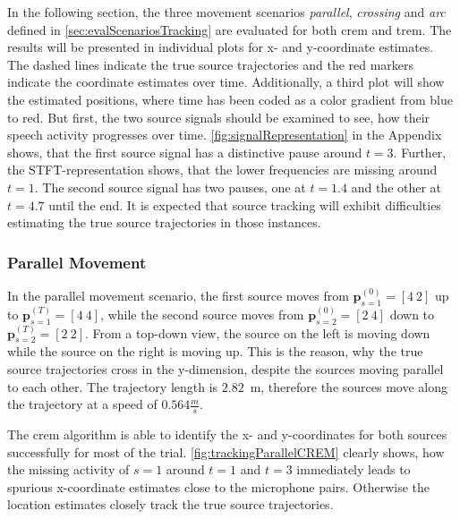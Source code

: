 In the following section, the three movement scenarios \emph{parallel}, \emph{crossing} and \emph{arc} defined in \autoref{sec:evalScenariosTracking} are evaluated for both \gls{crem} and \gls{trem}. The results will be presented in individual plots for x- and y-coordinate estimates. The dashed lines indicate the true source trajectories and the red markers indicate the coordinate estimates over time. Additionally, a third plot will show the estimated positions, where time has been coded as a color gradient from blue to red. But first, the two source signals should be examined to see, how their speech activity progresses over time. \autoref{fig:signalRepresentation} in the Appendix shows, that the first source signal has a distinctive pause around $t=3$. Further, the STFT-representation shows, that the lower frequencies are missing around $t=1$. The second source signal has two pauses, one at $t=1.4$ and the other at $t=4.7$ until the end. It is expected that source tracking will exhibit difficulties estimating the true source trajectories in those instances.

\togglefalse{quick}
\subsubsection*{Parallel Movement}
In the parallel movement scenario, the first source moves from $\bm p^{(0)}_{s=1}=[4~2]$ up to $\bm p^{(T)}_{s=1}=[4~4]$, while the second source moves from $\bm p^{(0)}_{s=2}=[2~4]$ down to $\bm p^{(T)}_{s=2}=[2~2]$. From a top-down view, the source on the left is moving down while the source on the right is moving up. This is the reason, why the true source trajectories cross in the y-dimension, despite the sources moving parallel to each other. The trajectory length is $2.82$~m, therefore the sources move along the trajectory at a speed of $0.564\frac{m}{s}$. 



The \gls{crem} algorithm is able to identify the x- and y-coordinates for both sources successfully for most of the trial. \autoref{fig:trackingParallelCREM} clearly shows, how the missing activity of $s=1$ around $t=1$ and $t=3$ immediately leads to spurious x-coordinate estimates close to the microphone pairs. Otherwise the location estimates closely track the true source trajectories.




